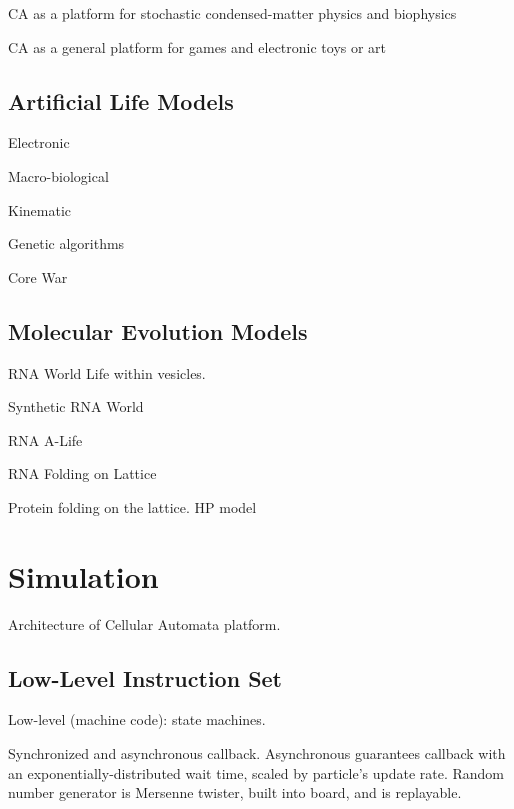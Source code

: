 \documentclass{acm_proc_article-sp}
\begin{document}
CA as a platform for stochastic condensed-matter physics and biophysics
\cite{Schiff2007}

CA as a general platform for games
\cite{SimCity,DwarfFortress,Minecraft}
and electronic toys or art \cite{RuckerCAPOW,PowderToy}

\subsection{Artificial Life Models}

Electronic
\cite{VonNeumannBook,Wireworld}

Macro-biological
\cite{ConwaysLife,Langton1986}

Kinematic
\cite{Stevens2011}

Genetic algorithms
\cite{Tierra,Avida}

Core War
\cite{CoreWarGuidelines84,CoreWarDewdney85,BarkleyWaitSchmidtCoreWar2004}

\subsection{Molecular Evolution Models}

RNA World
\cite{Woese1967}
Life within vesicles.  %

Synthetic RNA World
\cite{PaulJoyce2002}

RNA A-Life
\cite{journals/alife/Schuster94}

RNA Folding on Lattice
\cite{LeoniVanderzande2003,JostEveraers2010,ZaraPretti2007,GillespieMayneJiang2009}

Protein folding on the lattice. HP model \cite{Dill1985,PandeRokhsar1999}

\section{Simulation}

Architecture of Cellular Automata platform.

\subsection{Low-Level Instruction Set}

Low-level (machine code):
state machines.

Synchronized and asynchronous callback.
Asynchronous guarantees callback with an exponentially-distributed wait time, scaled by particle's update rate.
Random number generator is Mersenne twister, built into board, and is replayable.
\end{document}
